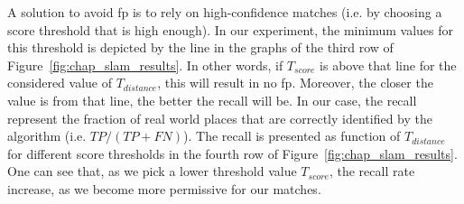 A solution to avoid \gls*{fp} is to rely on high-confidence matches (i.e. by choosing a score threshold that is high enough). In our experiment, the minimum values for this threshold is depicted by the line in the graphs of the third row of Figure~\ref{fig:chap_slam_results}. In other words, if $T_{score}$ is above that line for the considered value of $T_{distance}$, this will result in no \gls*{fp}. Moreover, the closer the value is from that line, the better the recall will be. In our case, the recall represent the fraction of real world places that are correctly identified by the algorithm (i.e. $TP/(TP+FN)$). The recall is presented as function of $T_{distance}$ for different score thresholds in the fourth row of Figure~\ref{fig:chap_slam_results}. One can see that, as we pick a lower threshold value $T_{score}$, the recall rate increase, as we become more permissive for our matches. 

